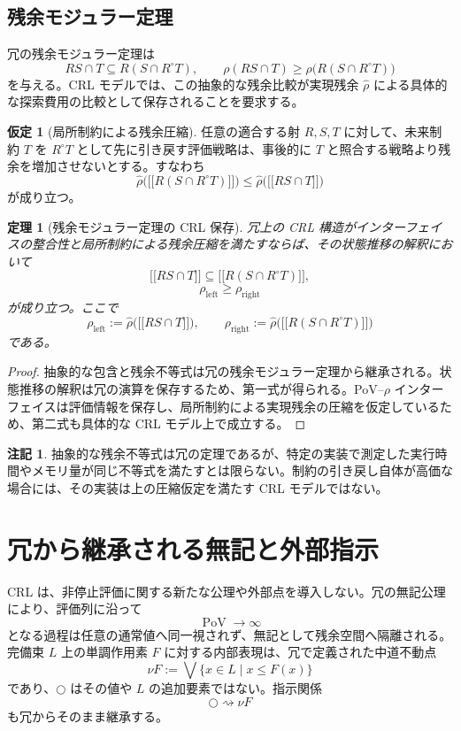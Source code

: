 \documentclass[a4paper,11pt]{ltjsarticle}
\theoremstyle{definition}
\newtheorem{assumption}[definition]{仮定}
\newtheorem{remark}[definition]{注記}
\theoremstyle{plain}
\newtheorem{theorem}[definition]{定理}
\newcommand{\PoV}{\operatorname{PoV}}
\newcommand{\dfix}{\bigcirc}
\newcommand{\sem}[1]{\mathopen{[\![}#1\mathclose{]\!]}}
\begin{document}
\subsection{残余モジュラー定理}

冗の残余モジュラー定理は
\[
 RS\cap T\subseteq R(S\cap R^\circ T),
 \qquad
 \rho(RS\cap T)\geq\rho\bigl(R(S\cap R^\circ T)\bigr)
\]
を与える。CRL モデルでは、この抽象的な残余比較が実現残余 $\widehat{\rho}$ による具体的な探索費用の比較として保存されることを要求する。

\begin{assumption}[局所制約による残余圧縮]
任意の適合する射 $R,S,T$ に対して、未来制約 $T$ を $R^\circ T$ として先に引き戻す評価戦略は、事後的に $T$ と照合する戦略より残余を増加させないとする。すなわち
\[
 \widehat{\rho}\bigl(\sem{R(S\cap R^\circ T)}\bigr)
 \leq
 \widehat{\rho}\bigl(\sem{RS\cap T}\bigr)
\]
が成り立つ。
\end{assumption}

\begin{theorem}[残余モジュラー定理の CRL 保存]
冗上の CRL 構造がインターフェイスの整合性と局所制約による残余圧縮を満たすならば、その状態推移の解釈において
\[
 \sem{RS\cap T}\subseteq\sem{R(S\cap R^\circ T)},
\]
\[
 \rho_{\mathrm{left}}\geq\rho_{\mathrm{right}}
\]
が成り立つ。ここで
\[
 \rho_{\mathrm{left}}:=\widehat{\rho}\bigl(\sem{RS\cap T}\bigr),
 \qquad
 \rho_{\mathrm{right}}:=\widehat{\rho}\bigl(\sem{R(S\cap R^\circ T)}\bigr)
\]
である。
\end{theorem}

\begin{proof}
抽象的な包含と残余不等式は冗の残余モジュラー定理から継承される。状態推移の解釈は冗の演算を保存するため、第一式が得られる。PoV--$\rho$ インターフェイスは評価情報を保存し、局所制約による実現残余の圧縮を仮定しているため、第二式も具体的な CRL モデル上で成立する。
\end{proof}

\begin{remark}
抽象的な残余不等式は冗の定理であるが、特定の実装で測定した実行時間やメモリ量が同じ不等式を満たすとは限らない。制約の引き戻し自体が高価な場合には、その実装は上の圧縮仮定を満たす CRL モデルではない。
\end{remark}

\section{冗から継承される無記と外部指示}

CRL は、非停止評価に関する新たな公理や外部点を導入しない。冗の無記公理により、評価列に沿って
\[
 \PoV\longrightarrow\infty
\]
となる過程は任意の通常値へ同一視されず、無記として残余空間へ隔離される。完備束 $L$ 上の単調作用素 $F$ に対する内部表現は、冗で定義された中道不動点
\[
 \nu F:=\bigvee\{x\in L\mid x\leq F(x)\}
\]
であり、$\dfix$ はその値や $L$ の追加要素ではない。指示関係
\[
 \dfix\rightsquigarrow\nu F
\]
も冗からそのまま継承する。
\end{document}
